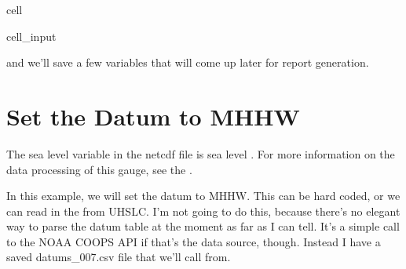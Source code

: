 \documentclass[letterpaper,10pt,english]{jupyterBook}
\begin{document}
\begin{sphinxuseclass}{cell}\begin{sphinxVerbatimInput}

\begin{sphinxuseclass}{cell_input}
\begin{sphinxVerbatim}[commandchars=\\\{\}]
    
\end{sphinxVerbatim}

\end{sphinxuseclass}\end{sphinxVerbatimInput}

\end{sphinxuseclass}
\sphinxAtStartPar
and we’ll save a few variables that will come up later for report generation.


\chapter{Set the Datum to MHHW}
\label{\detokenize{notebooks/FloodFrequency:set-the-datum-to-mhhw}}
\begin{sphinxShadowBox}

\sphinxAtStartPar
The sea level variable in the netcdf file is sea level . For more information on the data processing of this gauge, see the .
\end{sphinxShadowBox}

\sphinxAtStartPar
In this example, we will set the datum to MHHW. This can be hard coded, or we can read in the  from UHSLC. I’m not going to do this, because there’s no elegant way to parse the datum table at the moment as far as I can tell. It’s a simple call to the NOAA COOPS API if that’s the data source, though. Instead I have a saved datums\_007.csv file that we’ll call from.
\end{document}
